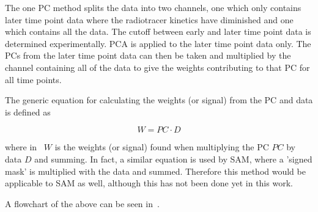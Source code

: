 \begin{itemize}
                        The one \gls{PC} method splits the data into two channels, one which only contains later time point data where the radiotracer kinetics have diminished and one which contains all the data. The cutoff between early and later time point data is determined experimentally. \gls{PCA} is applied to the later time point data only. The \glspl{PC} from the later time point data can then be taken and multiplied by the channel containing all of the data to give the weights contributing to that \gls{PC} for all time points.
                        
                        The generic equation for calculating the weights (or signal) from the \gls{PC} and data is defined as

                        \begin{equation} \label{eq:pca_data_driven_surrogate_signal_extraction_methods_for_dynamic_pet_methods_pc_weights}
                            W = PC \cdot D
                        \end{equation}
        
                        \noindent where in~ $W$ is the weights (or signal) found when multiplying the \gls{PC} $PC$ by data $D$ and summing. In fact, a similar equation is used by \gls{SAM}, where a 'signed mask' is multiplied with the data and summed. Therefore this method would be applicable to SAM as well, although this has not been done yet in this work.
                    \end{itemize}
                    
                    A flowchart of the above can be seen in~.
                
